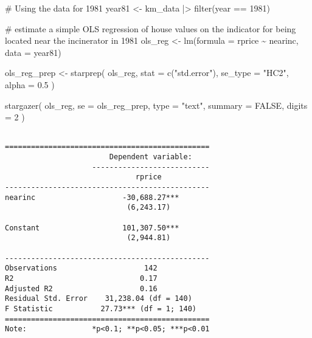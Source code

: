 \documentclass[
  letterpaper,
  DIV=11,
  numbers=noendperiod]{scrartcl}
\newenvironment{Shaded}{\begin{snugshade}}{\end{snugshade}}
\newcommand{\AttributeTok}[1]{\textcolor[rgb]{0.40,0.45,0.13}{#1}}
\newcommand{\CommentTok}[1]{\textcolor[rgb]{0.37,0.37,0.37}{#1}}
\newcommand{\ConstantTok}[1]{\textcolor[rgb]{0.56,0.35,0.01}{#1}}
\newcommand{\DecValTok}[1]{\textcolor[rgb]{0.68,0.00,0.00}{#1}}
\newcommand{\FloatTok}[1]{\textcolor[rgb]{0.68,0.00,0.00}{#1}}
\newcommand{\FunctionTok}[1]{\textcolor[rgb]{0.28,0.35,0.67}{#1}}
\newcommand{\NormalTok}[1]{\textcolor[rgb]{0.00,0.23,0.31}{#1}}
\newcommand{\OtherTok}[1]{\textcolor[rgb]{0.00,0.23,0.31}{#1}}
\newcommand{\SpecialCharTok}[1]{\textcolor[rgb]{0.37,0.37,0.37}{#1}}
\newcommand{\StringTok}[1]{\textcolor[rgb]{0.13,0.47,0.30}{#1}}
\begin{document}
\begin{Shaded}
\begin{Highlighting}[]
\CommentTok{\# Using the data for 1981}
\NormalTok{year81 }\OtherTok{\textless{}{-}}\NormalTok{ km\_data }\SpecialCharTok{|\textgreater{}}
  \FunctionTok{filter}\NormalTok{(year }\SpecialCharTok{==} \DecValTok{1981}\NormalTok{)}

\CommentTok{\# estimate a simple OLS regression of house values on the indicator for being located near the incinerator in 1981}
\NormalTok{ols\_reg }\OtherTok{\textless{}{-}} \FunctionTok{lm}\NormalTok{(}\AttributeTok{formula =}\NormalTok{ rprice }\SpecialCharTok{\textasciitilde{}}\NormalTok{ nearinc, }\AttributeTok{data =}\NormalTok{ year81)}

\NormalTok{ols\_reg\_prep }\OtherTok{\textless{}{-}} \FunctionTok{starprep}\NormalTok{(}
\NormalTok{  ols\_reg,}
  \AttributeTok{stat =} \FunctionTok{c}\NormalTok{(}\StringTok{"std.error"}\NormalTok{),}
  \AttributeTok{se\_type =} \StringTok{"HC2"}\NormalTok{,}
  \AttributeTok{alpha =} \FloatTok{0.5}
\NormalTok{)}

\FunctionTok{stargazer}\NormalTok{(}
\NormalTok{  ols\_reg,}
  \AttributeTok{se =}\NormalTok{ ols\_reg\_prep,}
  \AttributeTok{type =} \StringTok{"text"}\NormalTok{,}
  \AttributeTok{summary =} \ConstantTok{FALSE}\NormalTok{,}
  \AttributeTok{digits =} \DecValTok{2}
\NormalTok{)}
\end{Highlighting}
\end{Shaded}

\begin{verbatim}

===============================================
                        Dependent variable:    
                    ---------------------------
                              rprice           
-----------------------------------------------
nearinc                    -30,688.27***       
                            (6,243.17)         
                                               
Constant                   101,307.50***       
                            (2,944.81)         
                                               
-----------------------------------------------
Observations                    142            
R2                             0.17            
Adjusted R2                    0.16            
Residual Std. Error    31,238.04 (df = 140)    
F Statistic           27.73*** (df = 1; 140)   
===============================================
Note:               *p<0.1; **p<0.05; ***p<0.01
\end{verbatim}
\end{document}
